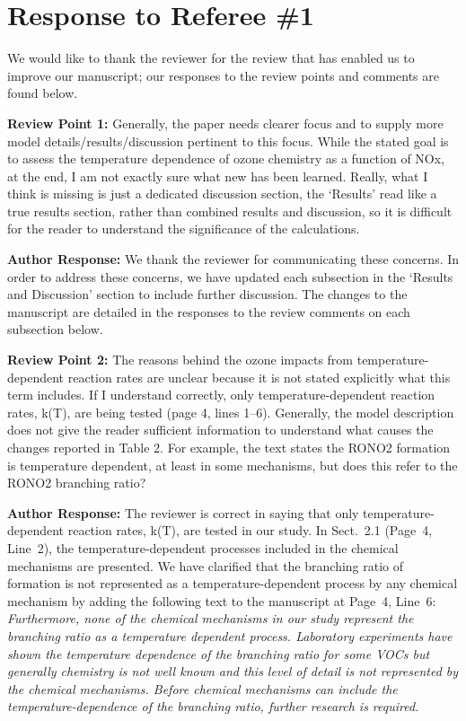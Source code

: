 \documentclass{article}
\begin{document}
\section*{Response to Referee \#1}

We would like to thank the reviewer for the review that has enabled us to improve our manuscript; our responses to the review points and comments are found below.

\textbf{Review Point 1:}  Generally, the paper needs clearer focus and to supply more model details/results/discussion pertinent to this focus. While the stated goal is to assess the temperature dependence of ozone chemistry as a function of NOx, at the end, I am not exactly sure what new has been learned. Really, what I think is missing is just a dedicated discussion section, the `Results' read like a true results section, rather than combined results and discussion, so it is difficult for the reader to understand the significance of the calculations.

\textbf{Author Response:} We thank the reviewer for communicating these concerns. In order to address these concerns, we have updated each subsection in the `Results and Discussion' section to include further discussion. The changes to the manuscript are detailed in the responses to the review comments on each subsection below.

\textbf{Review Point 2:} The reasons behind the ozone impacts from temperature-dependent reaction rates are unclear because it is not stated explicitly what this term includes. If I understand correctly, only temperature-dependent reaction rates, k(T), are being tested (page 4, lines 1–6). Generally, the model description does not give the reader sufficient information to understand what causes the changes reported in Table 2. For example, the text states the RONO2 formation is temperature dependent, at least in some mechanisms, but does this refer to the RONO2 branching ratio?

\textbf{Author Response:} The reviewer is correct in saying that only temperature-dependent reaction rates, k(T), are tested in our study. In Sect.~2.1 (Page~4, Line~2), the temperature-dependent processes included in the chemical mechanisms are presented. We have clarified that the branching ratio of  formation is not represented as a temperature-dependent process by any chemical mechanism by adding the following text to the manuscript at Page~4, Line~6: 
\textit{
Furthermore, none of the chemical mechanisms in our study represent the  branching ratio as a temperature dependent process. 
Laboratory experiments have shown the temperature dependence of the  branching ratio for some VOCs \citep{Atkinson:1987} but generally  chemistry is not well known \citep{Pusede:2015} and this level of detail is not represented by the chemical mechanisms.
Before chemical mechanisms can include the temperature-dependence of the  branching ratio, further research is required.
}
\end{document}
